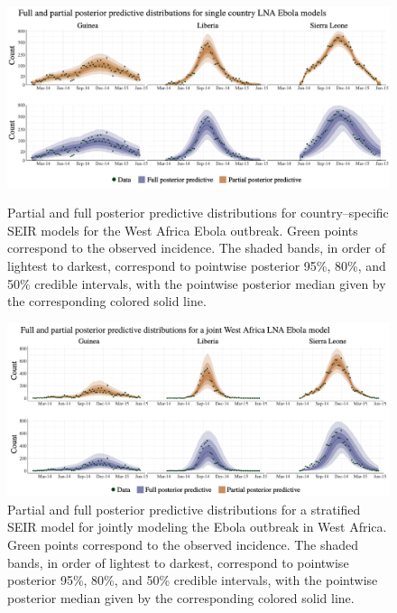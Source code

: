 \begin{figure}[htbp]
		\centering
		\includegraphics[width=\linewidth]{figures/ebola_single_postpreds_lna}
		\caption[Posterior predictive distributions for country--specific SEIR models for the West Africa Ebola outbreak.]{Partial and full posterior predictive distributions for country--specific SEIR models for the West Africa Ebola outbreak. Green points correspond to the observed incidence. The shaded bands, in order of lightest to darkest, correspond to pointwise posterior 95\%, 80\%, and 50\% credible intervals, with the pointwise posterior median given by the corresponding colored solid line.}
		\label{fig:ebola_single_postpreds}
		
		\includegraphics[width=\linewidth]{figures/ebola_joint_postpreds_lna}
		\caption[Posterior predictive distributions for a stratified SEIR model for the West Africa Ebola outbreak.]{Partial and full posterior predictive distributions for a stratified SEIR model for jointly modeling the Ebola outbreak in West Africa. Green points correspond to the observed incidence. The shaded bands, in order of lightest to darkest, correspond to pointwise posterior 95\%, 80\%, and 50\% credible intervals, with the pointwise posterior median given by the corresponding colored solid line.}
		\label{fig:ebola_joint_postpreds}
\end{figure}

